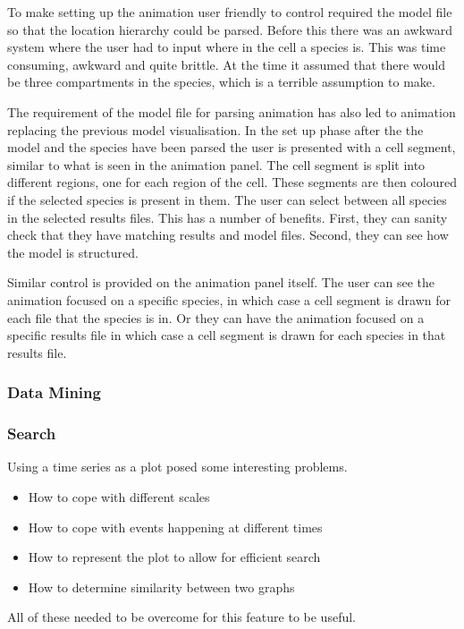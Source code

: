 To make setting up the animation user friendly to control required the model file so that the location hierarchy could be parsed.  Before this there was an awkward system where the user had to input where in the cell a species is.  This was time consuming, awkward and quite brittle.  At the time it assumed that there would be three compartments in the species, which is a terrible assumption to make.

The requirement of the model file for parsing animation has also led to animation replacing the previous model visualisation.  In the set up phase after the the model and the species have been parsed the user is presented with a cell segment, similar to what is seen in the animation panel.  The cell segment is split into different regions, one for each region of the cell.  These segments are then coloured if the selected species is present in them.  The user can select between all species in the selected results files.  This has a number of benefits.  First, they can sanity check that they have matching results and model files.  Second, they can see how the model is structured.

Similar control is provided on the animation panel itself.  The user can see the animation focused on a specific species, in which case a cell segment is drawn for each file that the species is in.  Or they can have the animation focused on a specific results file in which case a cell segment is drawn for each species in that results file.

\subsubsection{Data Mining}

\subsubsection{Search}

Using a time series as a plot posed some interesting problems.
\begin{itemize}
\item How to cope with different scales
\item How to cope with events happening at different times
\item How to represent the plot to allow for efficient search
\item How to determine similarity between two graphs
\end{itemize}

All of these needed to be overcome for this feature to be useful.

